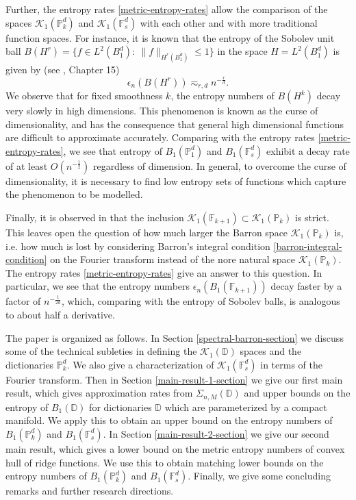 Further, the entropy rates \eqref{metric-entropy-rates} allow the comparison of the spaces $\mathcal{K}_1(\mathbb{P}_k^d)$ and $\mathcal{K}_1(\mathbb{F}_s^d)$ with each other and with more traditional function spaces. For instance, it is known that the entropy of the Sobolev unit ball $B(H^r) = \{f\in L^2(B_1^d):~\|f\|_{H^r(B_1^d)} \leq 1\}$ in the space $H = L^2(B_1^d)$ is given by (see \cite{lorentz1996constructive}, Chapter 15)
\begin{equation}
 \epsilon_n(B(H^r)) \eqsim_{r,d} n^{-\frac{r}{d}}.
\end{equation}
We observe that for fixed smoothness $k$, the entropy numbers of $B(H^k)$ decay very slowly in high dimensions. This phenomenon is known as the curse of dimensionality, and has the consequence that general high dimensional functions are difficult to approximate accurately. Comparing with the entropy rates \eqref{metric-entropy-rates}, we see that entropy of $B_1(\mathbb{P}_1^d)$ and $B_1(\mathbb{F}_s^d)$ exhibit a decay rate of at least $O(n^{-\frac{1}{2}})$ regardless of dimension. In general, to overcome the curse of dimensionality, it is necessary to find low entropy sets of functions which capture the phenomenon to be modelled.

Finally, it is observed in \cite{wojtowytsch2020representation} that the inclusion $\mathcal{K}_1(\mathbb{F}_{k+1})\subset \mathcal{K}_1(\mathbb{P}_k)$ is strict. This leaves open the question of how much larger the Barron space $\mathcal{K}_1(\mathbb{P}_k)$ is, i.e. how much is lost by considering Barron's integral condition \eqref{barron-integral-condition} on the Fourier transform instead of the nore natural space $\mathcal{K}_1(\mathbb{P}_k)$. The entropy rates \eqref{metric-entropy-rates} give an answer to this question. In particular, we see that the entropy numbers $\epsilon_n(B_1(\mathbb{F}_{k+1}))$ decay faster by a factor of $n^{-\frac{1}{2d}}$, which, comparing with the entropy of Sobolev balls, is analogous to about half a derivative.

The paper is organized as follows. In Section \ref{spectral-barron-section} we discuss some of the technical subleties in defining the $\mathcal{K}_1(\mathbb{D})$ spaces and the dictionaries $\mathbb{P}^d_k$. We also give a characterization of $\mathcal{K}_1(\mathbb{F}^d_s)$ in terms of the Fourier transform. Then in Section \ref{main-result-1-section} we give our first main result, which gives approximation rates from $\Sigma_{n,M}(\mathbb{D})$ and upper bounds on the entropy of $B_1(\mathbb{D})$ for dictionaries $\mathbb{D}$ which are parameterized by a compact manifold. We apply this to obtain an upper bound on the entropy numbers of $B_1(\mathbb{P}^d_k)$ and $B_1(\mathbb{F}^d_s)$. In Section \ref{main-result-2-section} we give our second main result, which gives a lower bound on the metric entropy numbers of convex hull of ridge functions. We use this to obtain matching lower bounds on the entropy numbers of $B_1(\mathbb{P}^d_k)$ and $B_1(\mathbb{F}^d_s)$. Finally, we give some concluding remarks and further research directions.



